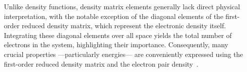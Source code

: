 Unlike density functions, density matrix elements generally lack direct
physical interpretation, with the notable exception of the diagonal elements of
the first-order reduced density matrix, which represent the electronic density
itself. Integrating these diagonal elements over all space yields the total
number of electrons in the system, highlighting their importance. Consequently,
many crucial properties ---particularly energies--- are conveniently expressed
using the first-order reduced density matrix and the electron pair
density~\cite{helgaker}.

\vfill
